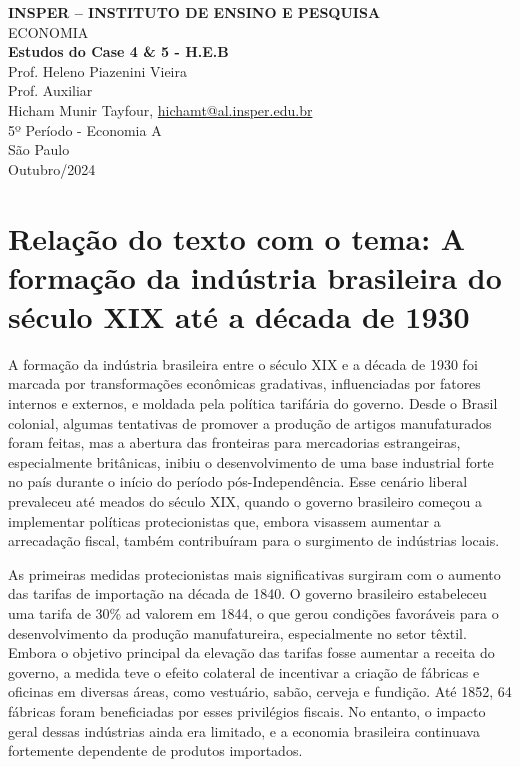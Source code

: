 \documentclass[a4paper,12pt]{article}[abntex2]
\begin{document}
\begin{titlepage}
    \centering
    \vspace*{1cm}
    \Large\textbf{INSPER – INSTITUTO DE ENSINO E PESQUISA}\\
    \Large ECONOMIA\\
    \vspace{1.5cm}
    \Large\textbf{Estudos do Case 4 \& 5 - H.E.B}\\
    \vspace{1.5cm}
    Prof. Heleno Piazenini Vieira\\
    Prof. Auxiliar \\
    \vfill
    \normalsize
    Hicham Munir Tayfour, \href{mailto:hichamt@al.insper.edu.br}{hichamt@al.insper.edu.br}\\
    5º Período - Economia A\\
    \vfill
    São Paulo\\
    Outubro/2024
\end{titlepage}

\newpage
\tableofcontents
\thispagestyle{empty} %
\newpage
\setcounter{page}{1} %
\justify
\onehalfspacing

\pagestyle{fancy}
\fancyhf{}
\rhead{\thepage}


\section{\textbf{Relação do texto com o tema: A formação da indústria brasileira do século XIX até a década de 1930}}

A formação da indústria brasileira entre o século XIX e a década de 1930 foi marcada por transformações econômicas gradativas, influenciadas por fatores internos e externos, e moldada pela política tarifária do governo. Desde o Brasil colonial, algumas tentativas de promover a produção de artigos manufaturados foram feitas, mas a abertura das fronteiras para mercadorias estrangeiras, especialmente britânicas, inibiu o desenvolvimento de uma base industrial forte no país durante o início do período pós-Independência. Esse cenário liberal prevaleceu até meados do século XIX, quando o governo brasileiro começou a implementar políticas protecionistas que, embora visassem aumentar a arrecadação fiscal, também contribuíram para o surgimento de indústrias locais.

As primeiras medidas protecionistas mais significativas surgiram com o aumento das tarifas de importação na década de 1840. O governo brasileiro estabeleceu uma tarifa de 30\% ad valorem em 1844, o que gerou condições favoráveis para o desenvolvimento da produção manufatureira, especialmente no setor têxtil. Embora o objetivo principal da elevação das tarifas fosse aumentar a receita do governo, a medida teve o efeito colateral de incentivar a criação de fábricas e oficinas em diversas áreas, como vestuário, sabão, cerveja e fundição. Até 1852, 64 fábricas foram beneficiadas por esses privilégios fiscais. No entanto, o impacto geral dessas indústrias ainda era limitado, e a economia brasileira continuava fortemente dependente de produtos importados.
\end{document}
